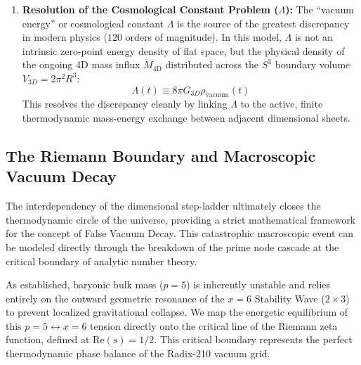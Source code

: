 \documentclass[11pt,a4paper]{article}
\theoremstyle{plain}
\theoremstyle{definition}
\theoremstyle{remark}
\begin{document}
\begin{enumerate}
    \begin{equation} 
    \hbar(t) = m_e \cdot c(t) \cdot r(t) = m_e \cdot f_0 \cdot \frac{r(t)^2}{\alpha(t)} 
    \end{equation} 
    As the poloidal radius $r(t)$ remains anchored to the sub-unit quantum-vacuum interval while the major radius $R(t)$ relaxes expansionally, the conformal gauge coupling ensures that local quantum-mechanical measurements of $\hbar$ remain perfectly invariant for comoving observers, despite the underlying cosmic drift.
    \item \textbf{Resolution of the Cosmological Constant Problem ($\Lambda$):} The ``vacuum energy'' or cosmological constant $\Lambda$ is the source of the greatest discrepancy in modern physics ($120$ orders of magnitude). In this model, $\Lambda$ is not an intrinsic zero-point energy density of flat space, but the physical density of the ongoing 4D mass influx $\dot{M}_{\text{4D}}$ distributed across the $S^3$ boundary volume $V_{3D} = 2\pi^2 R^3$: 
    \begin{equation} 
    \Lambda(t) \equiv 8\pi G_{3D} \rho_{\text{vacuum}}(t) 
    \end{equation}
    This resolves the discrepancy cleanly by linking $\Lambda$ to the active, finite thermodynamic mass-energy exchange between adjacent dimensional sheets.
\end{enumerate}

\subsection{The Riemann Boundary and Macroscopic Vacuum Decay}
\label{sec:vacuum_decay}

The interdependency of the dimensional step-ladder ultimately closes the thermodynamic circle of the universe, providing a strict mathematical framework for the concept of False Vacuum Decay. This catastrophic macroscopic event can be modeled directly through the breakdown of the prime node cascade at the critical boundary of analytic number theory.

As established, baryonic bulk mass ($p=5$) is inherently unstable and relies entirely on the outward geometric resonance of the $x=6$ Stability Wave ($2 \times 3$) to prevent localized gravitational collapse. We map the energetic equilibrium of this $p=5 \leftrightarrow x=6$ tension directly onto the critical line of the Riemann zeta function, defined at $\text{Re}(s) = 1/2$. This critical boundary represents the perfect thermodynamic phase balance of the Radix-210 vacuum grid.
\end{document}
